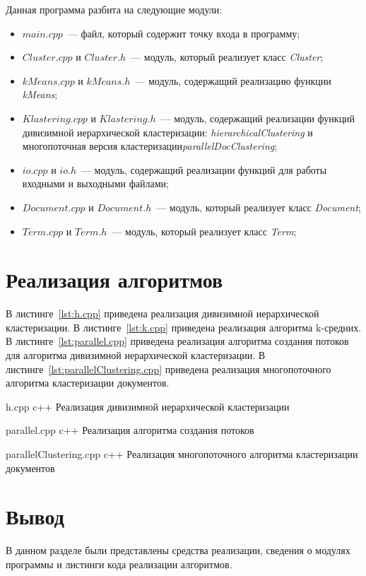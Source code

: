 Данная программа разбита на следующие модули:
\begin{itemize}
	\item $main.cpp$~--- файл, который содержит точку входа в программу;
	\item $Cluster.cpp$ и $Cluster.h$~--- модуль, который реализует класс \textit{Cluster};
	\item $kMeans.cpp$ и $kMeans.h$~--- модуль, содержащий реализацию функции \textit{kMeans};
	\item $Klastering.cpp$ и $Klastering.h$~--- модуль, содержащий реализации функций дивизимной иерархической кластеризации: \textit{hierarchicalClustering} и многопоточная версия кластеризации\textit{parallelDocClustering};
	\item $io.cpp$ и $io.h$~--- модуль, содержащий реализации функций для работы входными и выходными файлами;
	\item $Document.cpp$ и $Document.h$~--- модуль, который реализует класс \textit{Document};
	\item $Term.cpp$ и $Term.h$~--- модуль, который реализует класс \textit{Term};
\end{itemize}



\section{Реализация алгоритмов}

В листинге~\ref{lst:h.cpp} приведена реализация дивизимной иерархической кластеризации.
В листинге~\ref{lst:k.cpp} приведена реализация алгоритма k-средних.
В листинге~\ref{lst:parallel.cpp} приведена реализация алгоритма создания потоков для алгоритма дивизимной иерархической кластеризации.
В листинге~\ref{lst:parallelClustering.cpp} приведена реализация многопоточного алгоритма кластеризации документов.


{h.cpp} %
{c++} %
{Реализация дивизимной иерархической кластеризации} %

\clearpage

{parallel.cpp} %
{c++} %
{Реализация алгоритма создания потоков} %

\clearpage

{parallelClustering.cpp} %
{c++} %
{Реализация многопоточного алгоритма кластеризации документов} %

\section *{Вывод}

В данном разделе были представлены средства реализации, сведения о модулях программы и листинги кода реализации алгоритмов.
